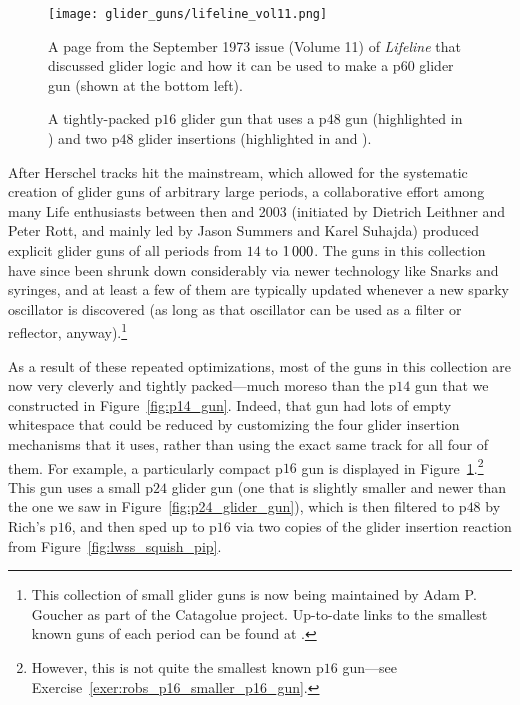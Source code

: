 \begin{figure}[!htb]
	\centering
	\begin{minipage}[b]{0.46\textwidth}
		\centering
		\texttt{[image: glider\_guns/lifeline\_vol11.png]}
		\caption{A page from the September 1973 issue (Volume 11) of \emph{Lifeline} that discussed glider logic and how it can be used to make a p$60$ glider gun (shown at the bottom left).}\label{fig:lifeline_v11}
	\end{minipage}\hfill
	\begin{minipage}[b]{0.5\textwidth}
		\centering
		\caption{A tightly-packed p$16$ glider gun that uses a p$48$ gun (highlighted in ) and two p$48$ glider insertions (highlighted in  and ).}\label{fig:p16_gun}
	\end{minipage}
\end{figure}

After Herschel tracks hit the mainstream, which allowed for the systematic creation of glider guns of arbitrary large periods, a collaborative effort among many Life enthusiasts between then and 2003 (initiated by Dietrich Leithner and Peter Rott, and mainly led by Jason Summers and Karel Suhajda) produced explicit glider guns of all periods from $14$ to $1{\,}000$. The guns in this collection have since been shrunk down considerably via newer technology like Snarks and syringes, and at least a few of them are typically updated whenever a new sparky oscillator is discovered (as long as that oscillator can be used as a filter or reflector, anyway).\footnote{This collection of small glider guns is now being maintained by Adam P. Goucher as part of the Catagolue project. Up-to-date links to the smallest known guns of each period can be found at .}

As a result of these repeated optimizations, most of the guns in this collection are now very cleverly and tightly packed---much moreso than the p$14$ gun that we constructed in Figure~\ref{fig:p14_gun}. Indeed, that gun had lots of empty whitespace that could be reduced by customizing the four glider insertion mechanisms that it uses, rather than using the exact same track for all four of them. For example, a particularly compact p$16$ gun is displayed in Figure~\ref{fig:p16_gun}.\footnote{However, this is not quite the smallest known p$16$ gun---see Exercise~\ref{exer:robs_p16_smaller_p16_gun}.} This gun uses a small p$24$ glider gun (one that is slightly smaller and newer than the one we saw in Figure~\ref{fig:p24_glider_gun}), which is then filtered to p$48$ by Rich's p$16$, and then sped up to p$16$ via two copies of the glider insertion reaction from Figure~\ref{fig:lwss_squish_pip}.

